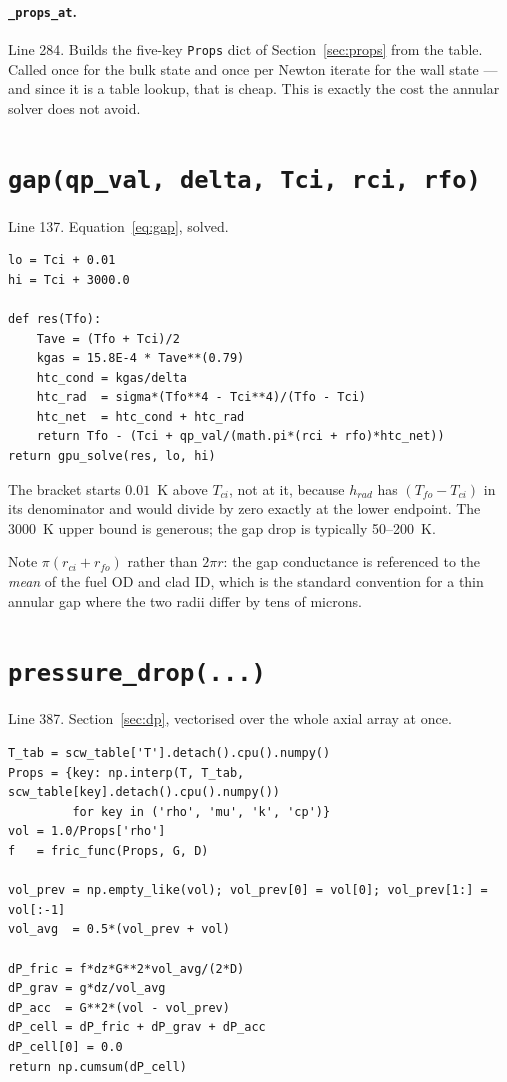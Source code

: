 \documentclass[11pt]{article}
\newcommand{\code}[1]{\texttt{#1}}
\begin{document}
\paragraph{\code{\_props\_at}.} Line 284. Builds the five-key \code{Props} dict of
Section~\ref{sec:props} from the table. Called once for the bulk state and once per
Newton iterate for the wall state --- and since it is a table lookup, that is cheap.
This is exactly the cost the annular solver does not avoid.

\section{\code{gap(qp\_val, delta, Tci, rci, rfo)}}
\label{sec:gap}
Line 137. Equation~\eqref{eq:gap}, solved.

\begin{lstlisting}
lo = Tci + 0.01
hi = Tci + 3000.0

def res(Tfo):
    Tave = (Tfo + Tci)/2
    kgas = 15.8E-4 * Tave**(0.79)
    htc_cond = kgas/delta
    htc_rad  = sigma*(Tfo**4 - Tci**4)/(Tfo - Tci)
    htc_net  = htc_cond + htc_rad
    return Tfo - (Tci + qp_val/(math.pi*(rci + rfo)*htc_net))
return gpu_solve(res, lo, hi)
\end{lstlisting}

The bracket starts $0.01$~K above $T_{ci}$, not at it, because $h_{rad}$ has
$(T_{fo} - T_{ci})$ in its denominator and would divide by zero exactly at the lower
endpoint. The 3000~K upper bound is generous; the gap drop is typically 50--200~K.

Note $\pi(r_{ci} + r_{fo})$ rather than $2\pi r$: the gap conductance is referenced to
the \emph{mean} of the fuel OD and clad ID, which is the standard convention for a thin
annular gap where the two radii differ by tens of microns.

\section{\code{pressure\_drop(...)}}
Line 387. Section~\ref{sec:dp}, vectorised over the whole axial array at once.

\begin{lstlisting}
T_tab = scw_table['T'].detach().cpu().numpy()
Props = {key: np.interp(T, T_tab, scw_table[key].detach().cpu().numpy())
         for key in ('rho', 'mu', 'k', 'cp')}
vol = 1.0/Props['rho']
f   = fric_func(Props, G, D)

vol_prev = np.empty_like(vol); vol_prev[0] = vol[0]; vol_prev[1:] = vol[:-1]
vol_avg  = 0.5*(vol_prev + vol)

dP_fric = f*dz*G**2*vol_avg/(2*D)
dP_grav = g*dz/vol_avg
dP_acc  = G**2*(vol - vol_prev)
dP_cell = dP_fric + dP_grav + dP_acc
dP_cell[0] = 0.0
return np.cumsum(dP_cell)
\end{lstlisting}
\end{document}
